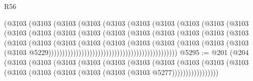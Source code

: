 \begin{lexlean}{R56}
\begin{coremodule}
{{{{{{{{{{{{{{{{{{{{{{{{{{{{{{{{{{{{{{{{{{{{{{{{{{{{{{{{{{{{{{{{{{{{{{{{{{{{{{{{{{{{{{{{{{{{{{{{{{{{{{{{{{{{{{{{{{{{{{{{{{{{{{{{{{{{{{{{{{{{{{{{{{{{{{{{{{{{{{{{{{{{{{{{{{{{{{{{{{{{{{{{{{{{{{{{{{{{{{{{{{{{{{{{{{{                                    (@3103
                                      (@3103
                                        (@3103
                                          (@3103
                                            (@3103
                                              (@3103
                                                (@3103
                                                  (@3103
                                                    (@3103
                                                      (@3103
                                                        (@3103
                                                          (@3103
                                                            (@3103
                                                              (@3103
                                                                (@3103
                                                                  (@3103
                                                                    (@3103
                                                                      (@3103
                                                                        (@3103
                                                                          (@3103
                                                                            (@3103
                                                                              (@3103
                                                                                (@3103
                                                                                  (@3103
                                                                                    (@3103
                                                                                      (@3103
                                                                                        (@3103
                                                                                          (@3103
                                                                                            (@3103
                                                                                              (@3103
                                                                                                (@3103
                                                                                                  @5229)))))))))))))))))))))))))))))))))))))))))))))))
@5295 := @201
    (@204
      (@3103
        (@3103
          (@3103
            (@3103
              (@3103
                (@3103
                  (@3103
                    (@3103
                      (@3103 (@3103 (@3103 (@3103 (@3103 (@3103 (@3103 (@3103 @5277)))))))))))))))))
}}}}}}}}}}}}}}}}}}}}}}}}}}}}}}}}}}}}}}}}}}}}}}}}}}}}}}}}}}}}}}}}}}}}}}}}}}}}}}}}}}}}}}}}}}}}}}}}}}}}}}}}}}}}}}}}}}}}}}}}}}}}}}}}}}}}}}}}}}}}}}}}}}}}}}}}}}}}}}}}}}}}}}}}}}}}}}}}}}}}}}}}}}}}}}}}}}}}}}}}}}}}}}}}}}}
\end{coremodule}
\end{lexlean}
